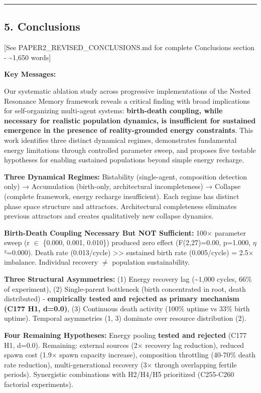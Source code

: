 \documentclass[
]{article}
\begin{document}
\begin{center}\rule{0.5\linewidth}{0.5pt}\end{center}

\subsection{5. Conclusions}\label{conclusions}

{[}See PAPER2\_REVISED\_CONCLUSIONS.md for complete Conclusions section
- \textasciitilde1,650 words{]}

\textbf{Key Messages:}

Our systematic ablation study across progressive implementations of the
Nested Resonance Memory framework reveals a critical finding with broad
implications for self-organizing multi-agent systems:
\textbf{birth-death coupling, while necessary for realistic population
dynamics, is insufficient for sustained emergence in the presence of
reality-grounded energy constraints}. This work identifies three
distinct dynamical regimes, demonstrates fundamental energy limitations
through controlled parameter sweep, and proposes five testable
hypotheses for enabling sustained populations beyond simple energy
recharge.

\textbf{Three Dynamical Regimes:} Bistability (single-agent, composition
detection only) → Accumulation (birth-only, architectural
incompleteness) → Collapse (complete framework, energy recharge
insufficient). Each regime has distinct phase space structure and
attractors. Architectural completeness eliminates previous attractors
and creates qualitatively new collapse dynamics.

\textbf{Birth-Death Coupling Necessary But NOT Sufficient:} 100×
parameter sweep (r $\in$ \{0.000, 0.001, 0.010\}) produced zero effect
(F(2,27)=0.00, p=1.000, $\eta$²=0.000). Death rate (0.013/cycle)
\textgreater\textgreater{} sustained birth rate (0.005/cycle) = 2.5×
imbalance. Individual recovery $\neq$ population sustainability.

\textbf{Three Structural Asymmetries:} (1) Energy recovery lag
(\textasciitilde1,000 cycles, 66\% of experiment), (2) Single-parent
bottleneck (birth concentrated in root, death distributed) -
\textbf{empirically tested and rejected as primary mechanism (C177 H1,
d=0.0)}, (3) Continuous death activity (100\% uptime vs 33\% birth
uptime). Temporal asymmetries (1, 3) dominate over resource distribution
(2).

\textbf{Four Remaining Hypotheses:} Energy pooling \textbf{tested and
rejected} (C177 H1, d=0.0). Remaining: external sources (2× recovery lag
reduction), reduced spawn cost (1.9× spawn capacity increase),
composition throttling (40-70\% death rate reduction),
multi-generational recovery (3× through overlapping fertile periods).
Synergistic combinations with H2/H4/H5 prioritized (C255-C260 factorial
experiments).
\end{document}
